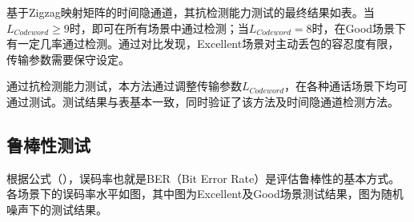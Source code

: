 基于Zigzag映射矩阵的时间隐通道，其抗检测能力测试的最终结果如表。当$L_{Codeword}\ge 9$时，即可在所有场景中通过检测；当$L_{Codeword} = 8$时，在Good场景下有一定几率通过检测。通过对比发现，Excellent场景对主动丢包的容忍度有限，传输参数需要保守设定。

通过抗检测能力测试，本方法通过调整传输参数$L_{Codeword}$，在各种通话场景下均可通过测试。测试结果与表基本一致，同时验证了该方法及时间隐通道检测方法。

\subsection{鲁棒性测试}
\label{chap:zigzag:results:robustness}


根据公式（），误码率也就是BER（Bit Error Rate）是评估鲁棒性的基本方式。各场景下的误码率水平如图，其中图为Excellent及Good场景测试结果，图为随机噪声下的测试结果。

